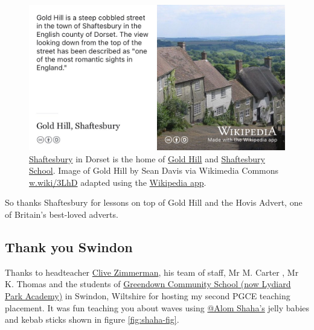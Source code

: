 \documentclass[
]{book}
\begin{document}
\begin{figure}

{\centering \includegraphics[width=1\linewidth]{images/shaftesbury} 

}

\caption{\href{https://en.wikipedia.org/wiki/Shaftesbury}{Shaftesbury} in Dorset is the home of \href{https://en.wikipedia.org/wiki/Gold_Hill,_Shaftesbury}{Gold Hill} and \href{https://en.wikipedia.org/wiki/Shaftesbury_School}{Shaftesbury School}. Image of Gold Hill by Sean Davis via Wikimedia Commons \href{https://w.wiki/3LhD}{w.wiki/3LhD} adapted using the \href{https://apps.apple.com/us/app/wikipedia/id324715238}{Wikipedia app}.}\label{fig:shaft-fig}
\end{figure}



So thanks Shaftesbury for lessons on top of Gold Hill and the Hovis Advert, one of Britain's best-loved adverts. \citep{hovisadvert} 🍞

\hypertarget{swindon}{%
\subsection{Thank you Swindon}\label{swindon}}

Thanks to headteacher \href{https://www.swindonadvertiser.co.uk/news/14113118.lydiard-school-looking-to-help-others-improve-gcse-results/}{Clive Zimmerman}, his team of staff, Mr M. Carter , Mr K. Thomas and the students of \href{https://en.wikipedia.org/wiki/Lydiard_Park_Academy}{Greendown Community School (now Lydiard Park Academy)} in Swindon, Wiltshire for hosting my second PGCE teaching placement. It was fun teaching you about waves using \href{https://twitter.com/alomshaha}{@Alom Shaha's} jelly babies and kebab sticks shown in figure \ref{fig:shaha-fig}.
\end{document}
